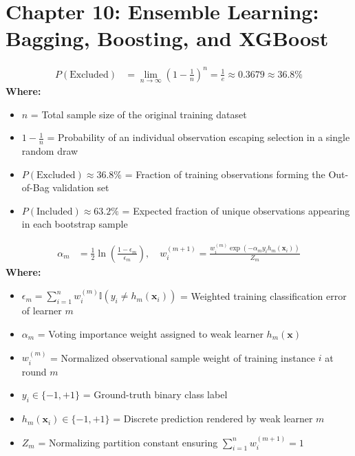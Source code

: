 \section*{Chapter 10: Ensemble Learning: Bagging, Boosting, and XGBoost}

\begin{formulabox}
\begin{align*}
    P(\text{Excluded}) &= \lim_{n \to \infty} \left(1 - \frac{1}{n}\right)^n = \frac{1}{e} \approx 0.3679 \approx 36.8\%
\end{align*}
\textbf{Where:}
\begin{itemize}[noitemsep, topsep=1pt]
    \item $n$ = Total sample size of the original training dataset
    \item $1 - \frac{1}{n}$ = Probability of an individual observation escaping selection in a single random draw
    \item $P(\text{Excluded}) \approx 36.8\%$ = Fraction of training observations forming the Out-of-Bag validation set
    \item $P(\text{Included}) \approx 63.2\%$ = Expected fraction of unique observations appearing in each bootstrap sample
\end{itemize}
\end{formulabox}

\begin{formulabox}
\begin{align*}
    \alpha_m &= \frac{1}{2} \ln \left( \frac{1 - \epsilon_m}{\epsilon_m} \right), \quad w_i^{(m+1)} = \frac{w_i^{(m)} \exp(-\alpha_m y_i h_m(\mathbf{x}_i))}{Z_m}
\end{align*}
\textbf{Where:}
\begin{itemize}[noitemsep, topsep=1pt]
    \item $\epsilon_m = \sum_{i=1}^n w_i^{(m)} \mathbb{I}(y_i \neq h_m(\mathbf{x}_i))$ = Weighted training classification error of learner $m$
    \item $\alpha_m$ = Voting importance weight assigned to weak learner $h_m(\mathbf{x})$
    \item $w_i^{(m)}$ = Normalized observational sample weight of training instance $i$ at round $m$
    \item $y_i \in \{-1, +1\}$ = Ground-truth binary class label
    \item $h_m(\mathbf{x}_i) \in \{-1, +1\}$ = Discrete prediction rendered by weak learner $m$
    \item $Z_m$ = Normalizing partition constant ensuring $\sum_{i=1}^n w_i^{(m+1)} = 1$
\end{itemize}
\end{formulabox}

